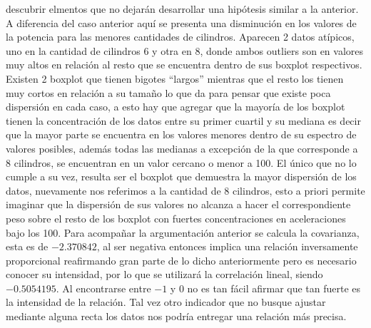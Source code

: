 \documentclass[letter,10pt]{article}
\begin{document}
descubrir elmentos que no dejarán desarrollar una hipótesis similar a la anterior.
A diferencia del caso anterior aquí se presenta una disminución en los valores de la potencia para las menores cantidades de cilindros.
Aparecen 2 datos atípicos, uno en la cantidad de cilindros 6 y otra en 8, donde ambos outliers son 
en valores muy altos en relación al resto que se encuentra
dentro de sus boxplot respectivos. Existen 2 boxplot que tienen bigotes ``largos'' mientras que el resto los tienen
 muy cortos en relación a su tamaño lo que da para pensar que existe poca dispersión en cada caso, 
 a esto hay que agregar que la mayoría de los boxplot tienen la concentración de los datos entre su primer cuartil y su mediana
 es decir que la mayor parte se encuentra en los valores menores dentro de su espectro de valores posibles, 
 además todas las medianas a excepción de la que corresponde a 8 cilindros, se encuentran en un valor cercano o menor a 100.
 El único que no lo cumple a su vez, resulta ser el boxplot que demuestra la mayor dispersión de los datos, nuevamente
 nos referimos a la cantidad de 8 cilindros, esto a priori permite imaginar que la dispersión de sus valores 
 no alcanza a hacer el correspondiente peso sobre el resto de los boxplot con fuertes concentraciones en 
 aceleraciones bajo los 100.
 Para acompañar la argumentación anterior se calcula la covarianza, esta es de $-2.370842$, al ser negativa entonces
 implica una relación inversamente proporcional 
 reafirmando gran parte de lo dicho anteriormente pero es necesario conocer su intensidad, por lo que se utilizará 
 la correlación lineal, siendo $-0.5054195$. Al encontrarse entre $-1$ y $0$ no es tan fácil afirmar que
 tan fuerte es la intensidad de la relación. Tal vez otro indicador que no busque ajustar mediante alguna recta los datos nos
 podría entregar una relación más precisa.
 


\newpage
\end{document}

